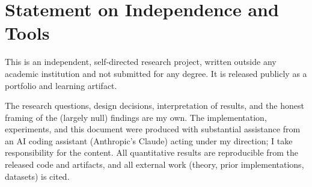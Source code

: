 \chapter*{Statement on Independence and Tools}
\thispagestyle{empty}

This is an independent, self-directed research project, written outside any academic
institution and not submitted for any degree. It is released publicly as a portfolio and
learning artifact.

The research questions, design decisions, interpretation of results, and the honest framing of
the (largely null) findings are my own. The implementation, experiments, and this document were
produced with substantial assistance from an AI coding assistant (Anthropic's Claude) acting
under my direction; I take responsibility for the content. All quantitative results are
reproducible from the released code and artifacts, and all external work (theory, prior
implementations, datasets) is cited.

